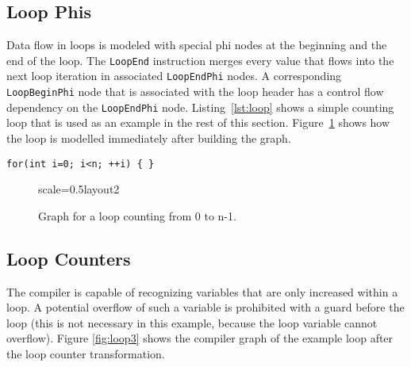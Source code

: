 \documentclass[twocolumn]{svjour3}
\newcommand\nodename[1]{\texttt{#1}}
\begin{document}
\subsection{Loop Phis}
Data flow in loops is modeled with special phi nodes at the beginning and the end of the loop.
The \nodename{LoopEnd} instruction merges every value that flows into the next loop iteration in associated \nodename{LoopEndPhi} nodes.
A corresponding \nodename{LoopBeginPhi} node that is associated with the loop header has a control flow dependency on the \nodename{LoopEndPhi} node.
Listing~\ref{lst:loop} shows a simple counting loop that is used as an example in the rest of this section.
Figure~\ref{fig:loop2} shows how the loop is modelled immediately after building the graph.

\begin{lstlisting}[label=lst:loop, caption=Loop example that counts from 0 to n-1., captionpos=b]
for(int i=0; i<n; ++i) { }
\end{lstlisting}

\begin{figure}[h]
  \centering
\begin{digraphenv}{scale=0.5}{layout2}
\end{digraphenv}
  \caption{Graph for a loop counting from 0 to n-1.}
  \label{fig:loop2}
\end{figure}

\subsection{Loop Counters}
The compiler is capable of recognizing variables that are only increased within a loop.
A potential overflow of such a variable is prohibited with a guard before the loop (this is not necessary in this example, because the loop variable cannot overflow).
Figure \ref{fig:loop3} shows the compiler graph of the example loop after the loop counter transformation.
\end{document}
